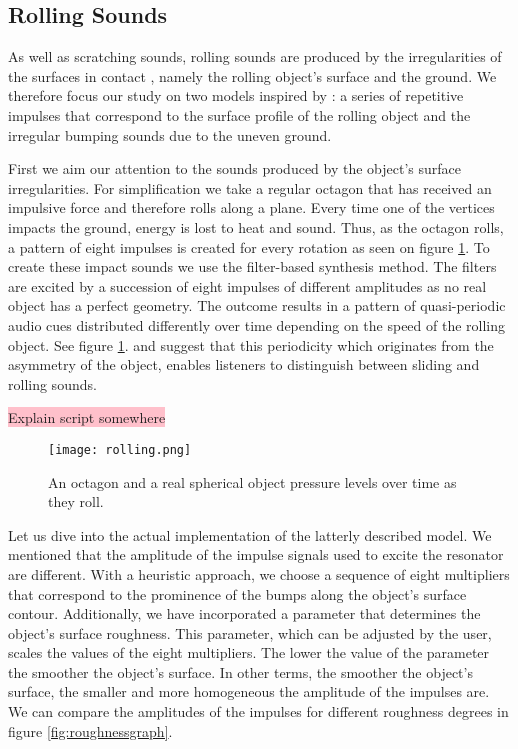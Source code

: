 \subsection{Rolling Sounds}

As well as scratching sounds, rolling sounds are produced by the irregularities of the surfaces in contact \cite{van2001foleyautomatic}, namely the rolling object's surface and the ground. We therefore focus our study on two models inspired by \cite{farnell2010designing}: a series of repetitive impulses that correspond to the surface profile of the rolling object and the irregular bumping sounds due to the uneven ground.

First we aim our attention to the sounds produced by the object's surface irregularities. For simplification we take a regular octagon that has received an impulsive force and therefore rolls along a plane. Every time one of the vertices impacts the ground, energy is lost to heat and sound. Thus, as the octagon rolls, a pattern of eight impulses is created for every rotation as seen on figure \ref{fig:rolling}. To create these impact sounds we use the filter-based synthesis method. The filters are excited by a succession of eight impulses of different amplitudes as no real object has a perfect geometry. The outcome results in a pattern of quasi-periodic audio cues distributed differently over time depending on the speed of the rolling object. See figure \ref{fig:rolling}. \cite{houben1999auditory} and \cite{rath2003expressive} suggest that this periodicity which originates from the asymmetry of the object, enables listeners to distinguish between sliding and rolling sounds.

\colorbox{pink}{Explain script somewhere}

\begin{figure}[H]
  \centering
    \texttt{[image: rolling.png]}
      \caption{An octagon and a real spherical object pressure levels over time as they roll.}
      \label{fig:rolling}
\end{figure} 

Let us dive into the actual implementation of the latterly described model. We mentioned that the amplitude of the impulse signals used to excite the resonator are different. With a heuristic approach, we choose a sequence of eight multipliers that correspond to the prominence of the bumps along the object's surface contour. Additionally, we have incorporated a parameter that determines the object's surface roughness. This parameter, which can be adjusted by the user, scales the values of the eight multipliers. The lower the value of the parameter the smoother the object's surface. In other terms, the smoother the object's surface, the smaller and more homogeneous the amplitude of the impulses are. We can compare the amplitudes of the impulses for different roughness degrees in figure  \ref{fig:roughnessgraph}.

